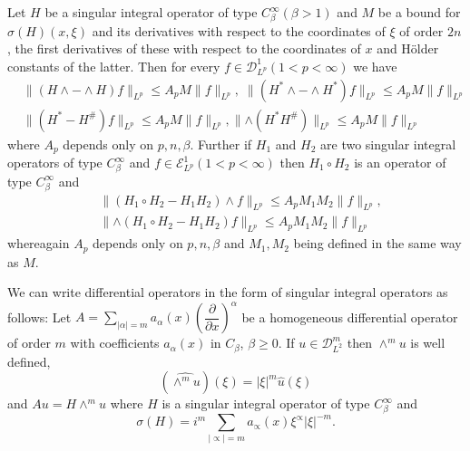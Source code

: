 \begin{theorem}\label{chap3-sec4-thm4}%
 Let $H$ be a singular integral operator of
  type $C^\infty_\beta (\beta >1)$ and $M$ be a bound for $ \sigma
  (H) (x, \xi)$ and its derivatives with respect to the coordinates of
  $\xi$ of order $2n$, the first derivatives of these with respect to
  the coordinates of $x$ and H\"older constants of the latter. Then
  for every $f \in \mathscr{D}^1_{L^p} (1 < p < \infty)$ we have  
{\fontsize{9pt}{11pt}\selectfont
\begin{equation*}
\begin{split}
& \parallel (H \wedge - \wedge H) f \parallel _{L^p} \leq A_p M
 \parallel f \parallel _{L^p}, \; \parallel (H^* \wedge - \wedge H^*) f
\parallel_{L^p} \leq A_p M \parallel f \parallel _{L^p} \\ 
& \parallel (H^* - H^{\#} ) f \parallel_{L^p} \leq A_p M \parallel f
\parallel_{L^p}, \parallel \wedge (H^* H^{\#}) \parallel_{L^p} \leq
A_p M \parallel f \parallel_{L^p}  
\end{split}\tag{4.13}\label{chap3-eq4.13}
\end{equation*}}\relax
where $A_p$ depends only on $p, n, \beta$. Further if $H_1$ and
$H_2$ are two singular integral operators of type $C^\infty_\beta$ and
$f \in \mathscr{E}^1_{L^p} (1 < p< \infty)$ then $ H_1 \circ H_2$ is an
operator of type  $C^\infty_\beta $ and  
\begin{equation*}
\begin{split}
& \parallel (H_1 \circ H_2 - H_1 H_2) \wedge f \parallel_{L^p} \leq A_p M_1
M_2 \parallel f \parallel_{L^p}, \\ 
& \parallel \wedge (H_1 \circ H_2 - H_1 H_2) f \parallel_{L^p} \leq A_p M_1
M_2 \parallel f \parallel_{L^p} 
\end{split}
\tag{4.14} \label{chap4-eq4.14}
\end{equation*}
where\pageoriginale again $ A_p$ depends only on $p, n, \beta$
and $ M_1, M_2$ being defined in the same way as $M$.   
\end{theorem}

We can write differential operators in the form of singular integral
operators as follows: Let $A = \sum\limits_{| \alpha | = m} a_\alpha
(x) \left(\dfrac{\partial}{\partial x}\right)^\alpha$ be a homogeneous
differential operator of order $m$ with coefficients $ a_\alpha (x) $
in $C_\beta$, $\beta \geq 0$. If $ u \in \mathscr{D}^m_{L^2}$ then $
\wedge^m u $ is well defined,  
$$
(\widehat{ \wedge^m u} ) (\xi) = | \xi |^m \hat{u} (\xi)
$$
and $Au = H \wedge^m u$ where $H$ is a singular integral operator
of type $C^\infty_\beta$ and  
\begin{equation*}
\sigma (H) = i^m \sum\limits_{| \propto | = m }a_\propto (x)
\xi^\propto | \xi |^{-m}. \tag{4.15} \label{chap3-eq4.15} 
\end{equation*}

